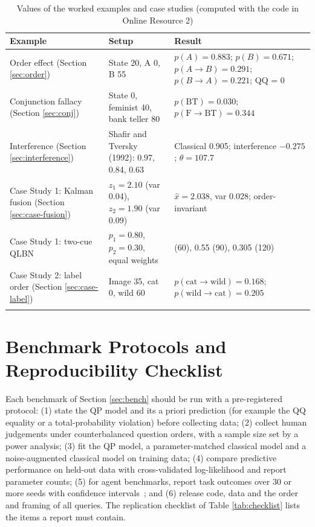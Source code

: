 \documentclass[pdflatex,sn-basic]{sn-jnl}
\begin{document}
\begin{appendices}
\begin{table}[ht]
\caption{Values of the worked examples and case studies (computed with the code in Online Resource 2)}\label{tab:worked}%
\footnotesize
\begin{tabular}{@{}>{\raggedright\arraybackslash}p{0.270\dimexpr\textwidth-6\tabcolsep\relax}>{\raggedright\arraybackslash}p{0.330\dimexpr\textwidth-6\tabcolsep\relax}>{\raggedright\arraybackslash}p{0.400\dimexpr\textwidth-6\tabcolsep\relax}@{}}
\toprule
\textbf{Example} & \textbf{Setup} & \textbf{Result} \\ \midrule
1 Order effect (Section \ref{sec:order}) & State 20\textdegree{}, A 0\textdegree{}, B 55\textdegree{} & $p(A) = 0.883$; $p(B) = 0.671$; $p(A \rightarrow B) = 0.291$; $p(B \rightarrow A) = 0.221$; QQ = 0 \\
2 Conjunction fallacy (Section \ref{sec:conj}) & State 0\textdegree{}, feminist 40\textdegree{}, bank teller 80\textdegree{} & $p(\text{BT}) = 0.030$; $p(\text{F} \rightarrow \text{BT}) = 0.344$ \\
3 Interference (Section \ref{sec:interference}) & Shafir and Tversky (1992): 0.97, 0.84, 0.63 & Classical 0.905; interference $-0.275$; $\theta = 107.7$\textdegree{} \\
Case Study 1: Kalman fusion (Section \ref{sec:case-fusion}) & $z_1 = 2.10$ (var 0.04), $z_2 = 1.90$ (var 0.09) & $\hat{x} = 2.038$, var 0.028; order-invariant \\
Case Study 1: two-cue QLBN & $p_1 = 0.80$, $p_2 = 0.30$, equal weights & 0.795 (60\textdegree{}), 0.55 (90\textdegree{}), 0.305 (120\textdegree{}) \\
Case Study 2: label order (Section \ref{sec:case-label}) & Image 35\textdegree{}, cat 0\textdegree{}, wild 60\textdegree{} & $p(\text{cat} \rightarrow \text{wild}) = 0.168$; $p(\text{wild} \rightarrow \text{cat}) = 0.205$ \\
\botrule
\end{tabular}
\end{table}


\section{Benchmark Protocols and Reproducibility Checklist}\label{app:protocols}
Each benchmark of Section \ref{sec:bench} should be run with a pre-registered protocol: (1) state the QP model and its a priori prediction (for example the QQ equality or a total-probability violation) before collecting data; (2) collect human judgements under counterbalanced question orders, with a sample size set by a power analysis; (3) fit the QP model, a parameter-matched classical model and a noise-augmented classical model on training data; (4) compare predictive performance on held-out data with cross-validated log-likelihood and report parameter counts; (5) for agent benchmarks, report task outcomes over 30 or more seeds with confidence intervals~\citep{Henderson2018}; and (6) release code, data and the order and framing of all queries. The replication checklist of Table \ref{tab:checklist} lists the items a report must contain.



\end{appendices}
\end{document}
